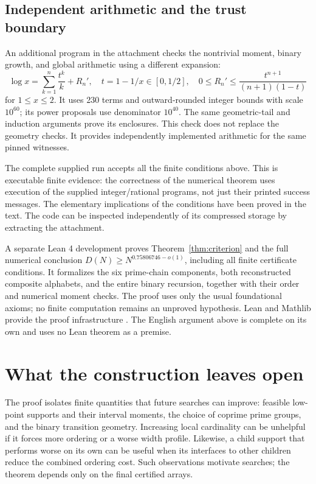 \documentclass[11pt]{article}
\theoremstyle{definition}
\theoremstyle{remark}
\begin{document}
\subsection{Independent arithmetic and the trust boundary}
An additional program in the attachment checks the nontrivial moment,
binary growth, and global arithmetic using a different expansion:
\[
 \log x=\sum_{k=1}^{n}\frac{t^k}{k}+R_n',\quad
 t=1-1/x\in[0,1/2],\quad
 0\le R_n'\le\frac{t^{n+1}}{(n+1)(1-t)}
\]
for $1\le x\le2$. It uses 230 terms and outward-rounded integer bounds
with scale $10^{60}$; its power proposals use denominator $10^{40}$.
The same geometric-tail and induction arguments prove its enclosures.
This check does not replace the geometry checks. It provides independently
implemented arithmetic for the same pinned witnesses.

The complete supplied run accepts all the finite conditions above. This
is executable finite evidence: the correctness of the numerical theorem
uses execution of the supplied integer/rational programs, not just their
printed success messages. The elementary implications of the conditions
have been proved in the text. The code can be inspected independently of
its compressed storage by extracting the attachment.

A separate Lean 4 development proves Theorem~\ref{thm:criterion} and the
full numerical conclusion $D(N)\ge N^{0.75806746-o(1)}$, including all finite
certificate conditions. It formalizes the six prime-chain components, both
reconstructed composite alphabets, and the entire binary recursion, together
with their order and numerical moment checks. The proof uses only the usual
foundational axioms; no finite computation remains an unproved hypothesis.
Lean and Mathlib provide the proof infrastructure
\cite{deMouraUllrich2021,Mathlib2020}. The English argument above is complete
on its own and uses no Lean theorem as a premise.

\section{What the construction leaves open}\label{sec:discussion}
The proof isolates finite quantities that future searches can improve:
feasible low-point supports and their interval moments, the choice of
coprime prime groups, and the binary transition geometry. Increasing local
cardinality can be unhelpful if it forces more ordering or a worse width
profile. Likewise, a child support that performs worse on its own can be
useful when its interfaces to other children reduce the combined ordering
cost. Such observations motivate searches; the theorem depends only on
the final certified arrays.
\end{document}
